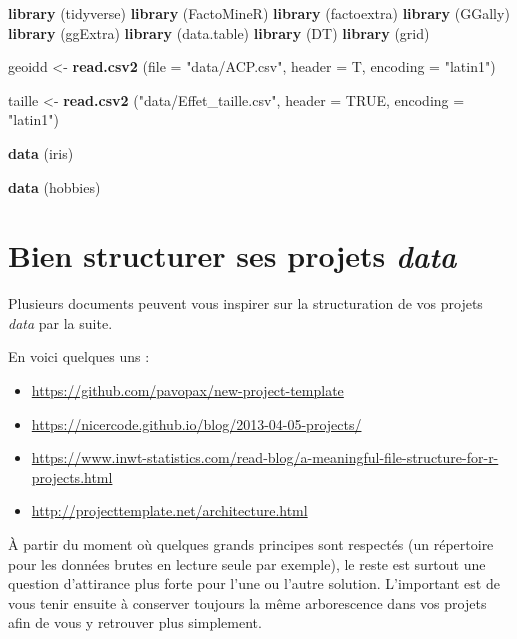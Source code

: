 \documentclass[]{book}
\newenvironment{Shaded}{\begin{snugshade}}{\end{snugshade}}
\newcommand{\DataTypeTok}[1]{\textcolor[rgb]{0.13,0.29,0.53}{#1}}
\newcommand{\KeywordTok}[1]{\textcolor[rgb]{0.13,0.29,0.53}{\textbf{#1}}}
\newcommand{\NormalTok}[1]{#1}
\newcommand{\OtherTok}[1]{\textcolor[rgb]{0.56,0.35,0.01}{#1}}
\newcommand{\StringTok}[1]{\textcolor[rgb]{0.31,0.60,0.02}{#1}}
\providecommand{\tightlist}{%
  \setlength{\itemsep}{0pt}\setlength{\parskip}{0pt}}
\begin{document}
\begin{Shaded}
\begin{Highlighting}[]
\KeywordTok{library}\NormalTok{ (tidyverse)}
\KeywordTok{library}\NormalTok{ (FactoMineR)}
\KeywordTok{library}\NormalTok{ (factoextra)}
\KeywordTok{library}\NormalTok{ (GGally)}
\KeywordTok{library}\NormalTok{ (ggExtra)}
\KeywordTok{library}\NormalTok{ (data.table)}
\KeywordTok{library}\NormalTok{ (DT)}
\KeywordTok{library}\NormalTok{ (grid)}

\NormalTok{geoidd <-}\StringTok{ }\KeywordTok{read.csv2}\NormalTok{ (}\DataTypeTok{file =} \StringTok{"data/ACP.csv"}\NormalTok{, }\DataTypeTok{header =}\NormalTok{ T, }\DataTypeTok{encoding =} \StringTok{"latin1"}\NormalTok{)}

\NormalTok{taille <-}\StringTok{ }\KeywordTok{read.csv2}\NormalTok{ (}\StringTok{"data/Effet_taille.csv"}\NormalTok{, }\DataTypeTok{header =} \OtherTok{TRUE}\NormalTok{,}
                     \DataTypeTok{encoding =} \StringTok{"latin1"}\NormalTok{)}

\KeywordTok{data}\NormalTok{ (iris)}

\KeywordTok{data}\NormalTok{ (hobbies)}
\end{Highlighting}
\end{Shaded}

\hypertarget{bien-structurer-ses-projets-data}{%
\section{\texorpdfstring{Bien structurer ses projets \emph{data}}{Bien structurer ses projets data}}\label{bien-structurer-ses-projets-data}}

Plusieurs documents peuvent vous inspirer sur la structuration de vos projets \emph{data} par la suite.

En voici quelques uns :

\begin{itemize}
\tightlist
\item
  \url{https://github.com/pavopax/new-project-template}
\item
  \url{https://nicercode.github.io/blog/2013-04-05-projects/}
\item
  \url{https://www.inwt-statistics.com/read-blog/a-meaningful-file-structure-for-r-projects.html}
\item
  \url{http://projecttemplate.net/architecture.html}
\end{itemize}

À partir du moment où quelques grands principes sont respectés (un répertoire pour les données brutes en lecture seule par exemple), le reste est surtout une question d'attirance plus forte pour l'une ou l'autre solution. L'important est de vous tenir ensuite à conserver toujours la même arborescence dans vos projets afin de vous y retrouver plus simplement.
\end{document}
